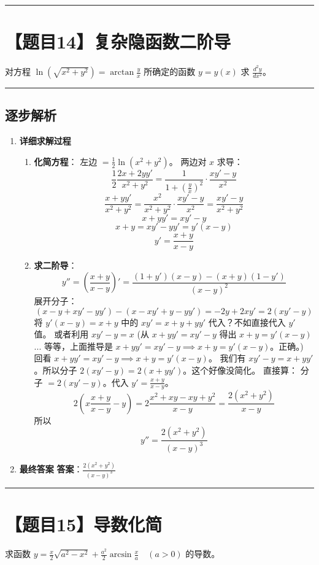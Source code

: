 \documentclass[UTF8]{ctexart}
\newenvironment{redenv}{\color{red}}{}
\newenvironment{detailedanalysis}{%
    \color{red}
    \begin{enumerate}[label=\textbf{第\arabic*步：}, leftmargin=*, align=left, itemsep=1.5ex]
}{%
    \end{enumerate}
}
\newcommand{\problemrule}{\noindent\rule{\textwidth}{1.5pt}\vspace{-0.8em}}
\newcommand{\analysisrule}{\noindent\rule{\textwidth}{0.8pt}\vspace{-0.8em}}
\begin{document}
\problemrule
\section*{【题目14】复杂隐函数二阶导}
对方程 $ \ln(\sqrt{x^{2}+y^{2}})=\arctan\frac{y}{x} $ 所确定的函数 $ y=y(x) $ 求 $ \frac{d^{2}y}{dx^{2}} $。

\begin{redenv}
\analysisrule
\subsection*{逐步解析}

\begin{detailedanalysis}
\item \textbf{详细求解过程}
\begin{enumerate}[label=(\arabic*)]
\item \textbf{化简方程}：
左边 $= \frac{1}{2} \ln(x^2+y^2)$。
两边对 $x$ 求导：
$$ \frac{1}{2} \frac{2x + 2yy'}{x^2+y^2} = \frac{1}{1+(\frac{y}{x})^2} \cdot \frac{xy' - y}{x^2} $$
$$ \frac{x+yy'}{x^2+y^2} = \frac{x^2}{x^2+y^2} \cdot \frac{xy'-y}{x^2} = \frac{xy'-y}{x^2+y^2} $$
$$ x + yy' = xy' - y $$
$$ x + y = xy' - yy' = y'(x-y) $$
$$ y' = \frac{x+y}{x-y} $$
\item \textbf{求二阶导}：
$$ y'' = \left( \frac{x+y}{x-y} \right)' = \frac{(1+y')(x-y) - (x+y)(1-y')}{(x-y)^2} $$
展开分子：
$$ (x-y + xy' - yy') - (x - xy' + y - yy') = -2y + 2xy' = 2(xy' - y) $$
将 $y'(x-y) = x+y$ 中的 $xy' = x+y+yy'$ 代入？不如直接代入 $y'$ 值。
或者利用 $xy' - y = x$ (从 $x+yy'=xy'-y$ 得出 $x+y=y'(x-y)$... 等等，上面推导是 $x+yy' = xy'-y \implies x+y = y'(x-y)$。正确。)
回看 $x+yy' = xy'-y \implies x+y = y'(x-y)$。
我们有 $xy' - y = x + yy'$。所以分子 $2(xy'-y) = 2(x+yy')$。这个好像没简化。
直接算：
分子 $= 2(xy' - y)$。代入 $y' = \frac{x+y}{x-y}$。
$$ 2(x \frac{x+y}{x-y} - y) = 2 \frac{x^2+xy - xy + y^2}{x-y} = \frac{2(x^2+y^2)}{x-y} $$
所以
$$ y'' = \frac{2(x^2+y^2)}{(x-y)^3} $$
\end{enumerate}

\item \textbf{最终答案}
\textbf{答案}：$ \frac{2(x^2+y^2)}{(x-y)^3} $
\end{detailedanalysis}
\end{redenv}

\problemrule
\section*{【题目15】导数化简}
求函数 $ y = \frac{x}{2} \sqrt{a^{2} - x^{2}} + \frac{a^{2}}{2} \arcsin \frac{x}{a} \quad (a > 0) $ 的导数。
\end{document}
